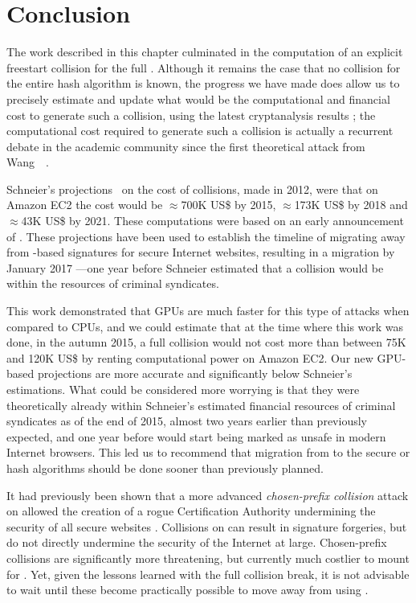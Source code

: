 \section{Conclusion}
\label{sec:conclusion}

The work described in this chapter culminated in the computation of an explicit freestart collision for the full \shaone. Although it remains the case that no collision for the entire hash algorithm is known,
the progress we have made does allow us to precisely estimate and update what would be the computational and financial cost to generate such a collision, using the latest cryptanalysis results \cite{DBLP:conf/eurocrypt/Stevens13};
the computational cost required to generate such a collision is actually a recurrent debate in the academic community since the first theoretical attack from Wang~\etal~\cite{DBLP:conf/crypto/WangYY05a}.

Schneier's projections~\cite{schneierSHA1} on the cost of \shaone collisions, made in 2012, were that on Amazon EC2 the cost would be $\approx$700K US\$ by 2015,
$\approx$173K US\$ by 2018 and $\approx$43K US\$ by 2021. These computations were based on
an early announcement of \cite{DBLP:conf/eurocrypt/Stevens13}. These projections have been used to establish the timeline of migrating away from \shaone-based signatures for secure Internet websites,
resulting in a migration by January 2017 ---one year before Schneier estimated that a \shaone collision would be within the resources of criminal syndicates. 

This work demonstrated that GPUs are much faster for this type of attacks when compared to CPUs,
and we could estimate that at the time where this work was done, in the autumn 2015, a full \shaone collision would not cost more than between 75K and 120K US\$ by renting computational power on Amazon EC2.
Our new GPU-based projections are more accurate and significantly below Schneier's estimations. What could be considered more worrying
is that they were theoretically already within Schneier's estimated financial resources of criminal syndicates as of the end of 2015,
almost two years earlier than previously expected, and one year before \shaone would start being marked as unsafe in modern Internet browsers.
This led us to recommend that migration from \shaone to the secure \shatwo or \shathree hash algorithms should be done sooner than previously planned.

It had previously been shown that a more advanced \emph{chosen-prefix collision} attack on \mdfive allowed the creation of a rogue Certification Authority undermining the security of all secure websites \cite{DBLP:conf/crypto/StevensSALMOW09}. 
Collisions on \shaone can result in \eg{} signature forgeries, but do not directly undermine the security of the Internet at large. Chosen-prefix collisions
are significantly more threatening, but currently much costlier to mount for \shaone. Yet, given the lessons learned with the \mdfive full collision break, it is not advisable to wait until these become practically possible
to move away from using \shaone.

